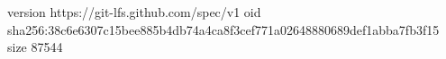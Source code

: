 version https://git-lfs.github.com/spec/v1
oid sha256:38c6e6307c15bee885b4db74a4ca8f3cef771a02648880689def1abba7fb3f15
size 87544
